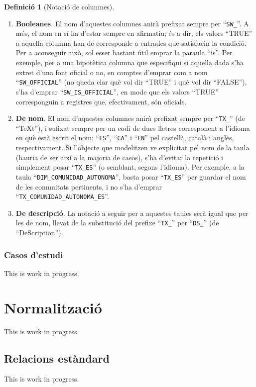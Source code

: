 \documentclass{article}
\theoremstyle{definition}
\newtheorem{definition}{Definició}
\begin{document}
\begin{definition}[Notació de columnes]
\begin{enumerate}
  \item \textbf{Booleanes}. El nom d'aquestes columnes anirà prefixat sempre per ``\verb|SW_|''. A més, el nom en sí ha d'estar sempre en afirmatiu; és a dir, els valors ``TRUE'' a aquella columna han de corresponde a entrades que satisfacin la condició. Per a aconseguir això, sol esser bastant útil emprar la paraula ``is''. Per exemple, per a una hipotètica columna que especifiqui si aquella dada s'ha extret d'una font oficial o no, en comptes d'emprar com a nom ``\verb|SW_OFFICIAL|'' (no queda clar què vol dir ``TRUE'' i què vol dir ``FALSE''), s'ha d'emprar ``\verb|SW_IS_OFFICIAL|'', en mode que els valors ``TRUE'' corresponguin a registres que, efectivament, són oficials.

  \item \textbf{De nom}. El nom d'aquestes columnes anirà prefixat sempre per ``\verb|TX_|'' (de ``TeXt''), i sufixat sempre per un codi de dues lletres corresponent a l'idioma en què està escrit el nom: ``\verb|ES|'', ``\verb|CA|'' i ``\verb|EN|'' pel castellà, català i anglès, respectivament. Si l'objecte que modelitzen ve explicitat pel nom de la taula (hauria de ser així a la majoria de casos), s'ha d'evitar la repetició i simplement posar ``\verb|TX_ES|'' (o semblant, segons l'idioma). Per exemple, a la taula ``\verb|DIM_COMUNIDAD_AUTONOMA|'', basta posar ``\verb|TX_ES|'' per guardar el nom de les comunitats pertinents, i no s'ha d'emprar ``\verb|TX_COMUNIDAD_AUTONOMA_ES|''.

  \item \textbf{De descripció}. La notació a seguir per a aquestes taules serà igual que per les de nom, llevat de la substitució del prefixe ``\verb|TX_|'' per ``\verb|DS_|'' (de ``DeScription'').
\end{enumerate}
\end{definition}

\subsubsection{Casos d'estudi}\label{section:nomenclature:columns:examples}
This is work in progress.

\section{Normalització}\label{section:normalization}
This is work in progress.
\subsection{Relacions estàndard}\label{section:normalization:standard}
This is work in progress.
\end{document}
